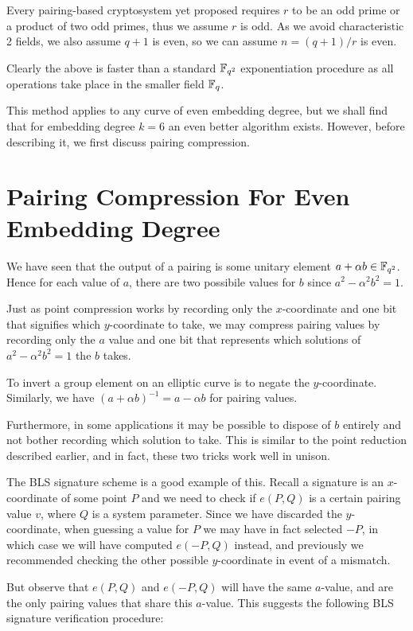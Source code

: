 Every pairing-based cryptosystem yet
proposed requires $r$ to be an odd prime or a product of two odd primes,
thus we assume $r$ is odd. As we avoid characteristic 2 fields,
we also assume $q + 1$ is even, so we
can assume $n = (q + 1) / r$ is even.

Clearly the above is faster than a standard $\mathbb{F}_{q^2}$ exponentiation
procedure as all operations take place in the smaller field $\mathbb{F}_q$.

This method applies to any curve of even embedding degree, but we shall
find that for embedding degree $k = 6$ an even better algorithm exists.
However, before describing it, we first discuss pairing compression.

\section {\label{sec:pairingcompressioneven}Pairing Compression For Even Embedding Degree}

We have seen that the output of a pairing is some unitary element
$a + \alpha b \in \mathbb{F}_{q^2}$.
Hence for each value of $a$, there are two possibile values for $b$
since $a^2 - \alpha^2 b^2 = 1$.

Just as point compression works by recording only the $x$-coordinate and
one bit that signifies which $y$-coordinate to take, we may compress pairing
values by recording only the $a$ value and one bit that represents which
solutions of $a^2 - \alpha^2 b^2 = 1$ the $b$ takes.

To invert a group element on an elliptic curve is to negate the $y$-coordinate.
Similarly, we have $(a + \alpha b)^{-1} = a - \alpha b$ for pairing values.

Furthermore, in some applications it may be possible to dispose of $b$ entirely
and not bother recording which solution to take. This is similar to the point
reduction described earlier, and in fact, these two tricks work well in unison.

The BLS signature scheme is a good example of this.
Recall a signature is an $x$-coordinate of some point $P$ and we need to
check if $e(P, Q)$ is a certain pairing value $v$,
where $Q$ is a system parameter.
Since we have discarded the $y$-coordinate, when guessing a value for $P$
we may have in fact selected $-P$, in which case we will have computed
$e(-P, Q)$ instead, and previously we recommended checking the other possible
$y$-coordinate in event of a mismatch.

But observe that $e(P,Q)$ and $e(-P,Q)$ will have the same $a$-value,
and are the only pairing values that share this $a$-value.
This suggests the following BLS signature verification procedure:

